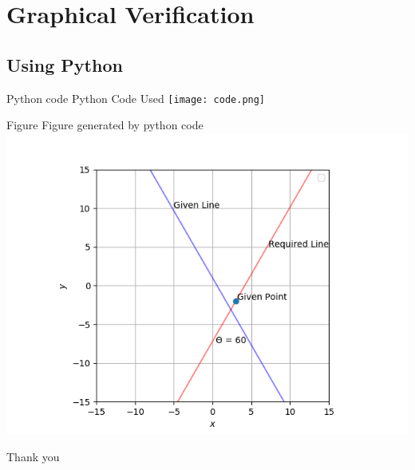 \documentclass{beamer}
\begin{document}
\section{Graphical Verification}
\subsection{Using Python}




\begin{frame}{Python code}
Python Code Used
 \centering
\texttt{[image: code.png]}

\end{frame}


\begin{frame}{Figure}
Figure generated by python code
 \centering
\includegraphics[scale=0.6]{Matrix.png}

\end{frame}


\begin{frame}
\Huge{\centerline{Thank you}}
\end{frame}


\end{document}
